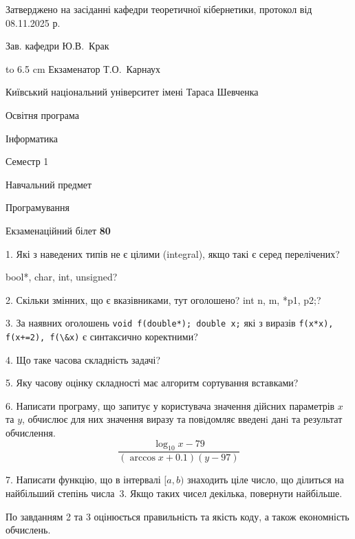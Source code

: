 \documentclass[12pt, ukrainian]{article}
\def\code#1{\Verb!#1!}
\begin{document}
{\smallskip\smallskip \begin {scriptsize} Затверджено на засіданні кафедри теоретичної кібернетики, протокол   від   08.11.2025 р.\par\smallskip\smallskip\smallskip\smallskip
{\parbox {6.5 cm} {Зав. кафедри \dotfill Ю.В.~Крак}}\hspace {0.7cm} {\hbox to 6.5 cm { Екзаменатор \dotfill Т.О.~Карнаух}} \end{scriptsize}}
\vspace{0.9cm}
{{\begin {scriptsize}\par
{ \center  Київський національний університет імені Тараса Шевченка \par}
{\parbox {5 cm}{Освітня програма \hfill}{\parbox {7 cm}{Інформатика\hfill}}\parbox {6 cm}{\hfill Семестр 1}}\par
{\parbox {5 cm} {Навчальний предмет \hfill}\parbox {7 cm}{Програмування \hfill}\parbox {6cm}{\hfill}\par}\vspace{-15pt} \end{scriptsize}}{\center Екзаменаційний білет \No \textbf { 80 }\par}}
{%
1. Які з наведених типів не є цілими (integral), якщо такі є серед перелічених?

bool*, char, int, unsigned?
\par
\vspace{2mm}
2. Скільки змінних, що є вказівниками, тут оголошено?
int n, m, *p1, p2;?
\par
\vspace{2mm}
3. За наявних оголошень \code{void f(double*); double x;} які з виразів \code{f(x*x), f(x+=2), f(\&x)} є синтаксично коректними?
\par
\vspace{2mm}
4. Що таке часова складність задачі?
\par
\vspace{2mm}
5. Яку часову оцінку складності має алгоритм сортування вставками?
\par
\vspace{2mm}
6. Написати програму, що запитує у користувача значення дійсних параметрів $x$ та $y$, обчислює для них значення виразу та повiдомляє введенi данi та результат обчислення.
$$\frac{\log_{10} x - 79}{(\arccos x + 0.1) (y - 97)}$$ 

\par
7. Написати функцію, що в інтервалі $[a, b)$ знаходить ціле число, що ділиться на найбільший степінь числа 3. Якщо таких чисел декілька, повернути найбільше.

По завданням 2 та 3 оцінюється правильність та якість коду, а також економність обчислень.

}
\end{document}
